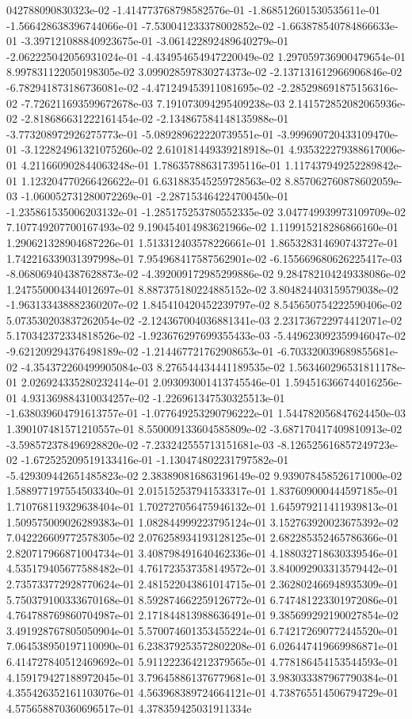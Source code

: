 042788090830323e-02	-1.414773768798582576e-01	-1.868512601530535611e-01	-1.566428638396744066e-01	-7.530041233378002852e-02	-1.663878540784866633e-01	-3.397121088840923675e-01	-3.061422892489640279e-01	-2.062225042056931024e-01	-4.434954654947220049e-02	1.297059736900479654e-01	8.997831122050198305e-02	3.099028597830274373e-02	-2.137131612966906846e-02	-6.782941873186736081e-02	-4.471249453911081695e-02	-2.285298691875156316e-02	-7.726211693599672678e-03	7.191073094295409238e-03	2.141572852082065936e-02	-2.818686631222161454e-02	-2.134867584148135988e-01	-3.773208972926275773e-01	-5.089289622220739551e-01	-3.999690720433109470e-01	-3.122824961321075260e-02	2.610181449339218918e-01	4.935322279388617006e-01	4.211660902844063248e-01	1.786357886317395116e-01	1.117437949252289842e-01	1.123204770266426622e-01	6.631883545259728563e-02	8.857062760878602059e-03	-1.060052731280072269e-01	-2.287153464224700450e-01	-1.235861535006203132e-01	-1.285175253780552335e-02	3.047749939973109709e-02	7.107749207700167493e-02	9.190454014983621966e-02	1.119915218286866160e-01	1.290621328904687226e-01	1.513312403578226661e-01	1.865328314690743727e-01	1.742216339031397998e-01	7.954968417587562901e-02	-6.155669680626225417e-03	-8.068069404387628873e-02	-4.392009172985299886e-02	9.284782104249338086e-02	1.247550004344012697e-01	8.887375180224885152e-02	3.804824403159579038e-02	-1.963133438882360207e-02	1.845410420452239797e-02	8.545650754222590406e-02	5.073530203837262054e-02	-2.124367004036881341e-03	2.231736722974412071e-02	5.170342372334818526e-02	-1.923676297699355433e-03	-5.449623092359946047e-02	-9.621209294376498189e-02	-1.214467721762908653e-01	-6.703320039689855681e-02	-4.354372260499905084e-03	8.276544434441189535e-02	1.563460296531811178e-01	2.026924335280232414e-01	2.093093001413745546e-01	1.594516366744016256e-01	4.931369884310034257e-02	-1.226961347530325513e-01	-1.638039604791613757e-01	-1.077649253290796222e-01	1.544782056847624450e-03	1.390107481571210557e-01	8.550009133604585809e-02	-3.687170417409810913e-02	-3.598572378496928820e-02	-7.233242555713151681e-03	-8.126525616857249723e-02	-1.672525209519133416e-01	-1.130474802231797582e-01	-5.429309442651485823e-02	2.383890816863196149e-02	9.939078458526171000e-02	1.588977197554503340e-01	2.015152537941533317e-01	1.837609000444597185e-01	1.710768119329638404e-01	1.702727056475946132e-01	1.645979211411939813e-01	1.509575009026289383e-01	1.082844999223795124e-01	3.152763920023675392e-02	7.042226609772578305e-02	2.076258934193128125e-01	2.682285352465786366e-01	2.820717966871004734e-01	3.408798491640462336e-01	4.188032718630339546e-01	4.535179405677588482e-01	4.761723537358149572e-01	3.840092903313579442e-01	2.735733772928770624e-01	2.481522043861014715e-01	2.362802466948935309e-01	5.750379100333670168e-01	8.592874662259126772e-01	6.747481223301972086e-01	4.764788769860704987e-01	2.171844813988636491e-01	9.385699292190027854e-02	3.491928767805050904e-01	5.570074601353455224e-01	6.742172690772445520e-01	7.064538950197110090e-01	6.238379253572802208e-01	6.026447419669986871e-01	6.414727840512469692e-01	5.911222364212379565e-01	4.778186454153544593e-01	4.159179427188972045e-01	3.796458861376779681e-01	3.983033387967790384e-01	4.355426352161103076e-01	4.563968389724664121e-01	4.738765514506794729e-01	4.575658870360696517e-01	4.378359425031911334e